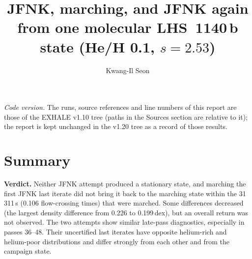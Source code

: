 \documentclass[english,a4paper]{my_memo}
\begin{document}
\title{JFNK, marching, and JFNK again from one molecular LHS~1140\,b state
(He/H 0.1, $s=2.53$)}
\author{Kwang-Il Seon}
\maketitle

\noindent\textit{Code version.} The runs, source references and line numbers
of this report are those of the EXHALE v1.10 tree (paths in the Sources
section are relative to it); the report is kept unchanged in the v1.20 tree as
a record of those results.

\section*{Summary}

\textbf{Verdict.} Neither JFNK attempt produced a stationary state, and marching
the first JFNK last iterate did not bring it back to the marching state
within the 31\,311\,s (0.106 flow-crossing times) that were marched. Some
differences decreased (the largest density difference from 0.226 to
0.199\,dex), but an overall return was not observed. The two attempts show
similar late-pass diagnostics, especially in passes 36--48. Their
uncertified last iterates have opposite helium-rich and helium-poor
distributions and differ strongly from each other and from the campaign
state.
\end{document}
